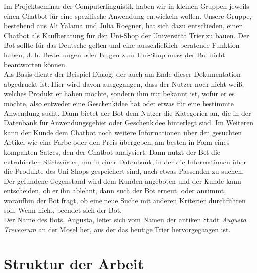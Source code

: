 Im Projektseminar der Computerlinguistik haben wir in kleinen Gruppen jeweils einen Chatbot für eine spezifische Anwendung entwickeln wollen. Unsere Gruppe, bestehend aus Ali Yalama und Julia Roegner, hat sich dazu entschieden, einen Chatbot als Kaufberatung für den Uni-Shop der Universität Trier zu bauen. Der Bot sollte für das Deutsche gelten und eine ausschließlich beratende Funktion haben, d. h. Bestellungen oder Fragen zum Uni-Shop muss der Bot nicht beantworten können.\\
Als Basis diente der \textcolor[rgb]{1,0,0}{Beispiel-Dialog}, der auch am Ende dieser Dokumentation abgedruckt ist. Hier wird davon ausgegangen, dass der Nutzer noch nicht weiß, welches Produkt er haben möchte, sondern ihm nur bekannt ist, wofür er es möchte, also entweder eine Geschenkidee hat oder etwas für eine bestimmte Anwendung sucht. Dann bietet der Bot dem Nutzer die Kategorien an, die in der Datenbank für Anwendungsgebiet oder Geschenkidee hinterlegt sind. Im Weiteren kann der Kunde dem Chatbot noch weitere Informationen über den gesuchten Artikel wie eine Farbe oder den Preis übergeben, am besten in Form eines kompakten Satzes, den der Chatbot analysiert. Dann nutzt der Bot die extrahierten Stichwörter, um in einer Datenbank, in der die Informationen über die Produkte des Uni-Shops gespeichert sind, nach etwas Passenden zu suchen.\\
Der gefundene Gegenstand wird dem Kunden angeboten und der Kunde kann entscheiden, ob er ihn ablehnt, dann such der Bot erneut, oder annimmt, woraufhin der Bot fragt, ob eine neue Suche mit anderen Kriterien durchführen soll. Wenn nicht, beendet sich der Bot.\\
Der Name des Bots, Augusta, leitet sich vom Namen der antiken Stadt \textit{Augusta Treveorum} an der Mosel her, aus der das heutige Trier hervorgegangen ist.\\


\section{Struktur der Arbeit}
\label{sec:Inhaltsbeschreibung} 

